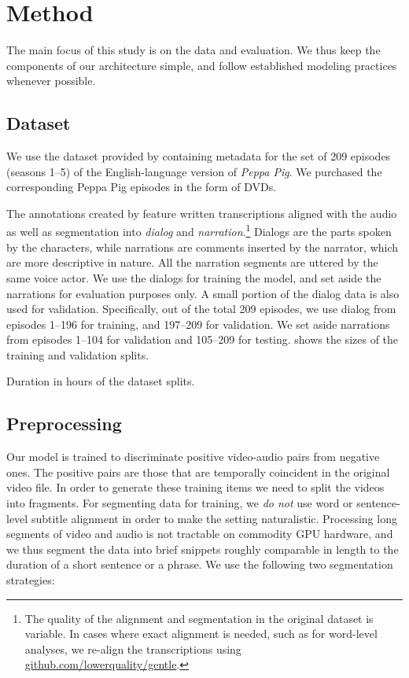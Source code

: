 \section{Method}
\label{sec:method}

The main focus of this study is on the data and evaluation. We thus
keep the components of our architecture simple, and follow established
modeling practices whenever possible.

\subsection{Dataset}
We use the dataset provided by \citet{papasarantopoulos2021narration}
containing metadata for the set of 209 episodes (seasons 1--5) of the
English-language version of {\it Peppa Pig}. We purchased the
corresponding Peppa Pig episodes in the form of DVDs. 

The annotations created by  \citet{papasarantopoulos2021narration}
feature written transcriptions aligned with the
audio as well as segmentation into {\it dialog} and {\it
  narration}.\footnote{The quality of the
  alignment and segmentation in the original dataset is variable. In
  cases where exact alignment is needed, such as for word-level
  analyses, we re-align the transcriptions using
  \url{github.com/lowerquality/gentle}.}  Dialogs are the parts spoken
by the characters, while narrations are comments inserted by the
narrator, which are more descriptive in nature. All the narration
segments are uttered by the same voice actor. We use the dialogs for
training the model, and set aside the narrations for evaluation
purposes only. A small portion of the dialog data is also used for
validation.  Specifically, out of the total 209 episodes, we use
dialog from episodes 1--196 for training, and 197--209 for
validation. We set aside narrations from episodes 1--104 for
validation and 105--209 for testing. 
shows the sizes of the training and validation splits.

\begin{table}[htb]
  \centering 
  \caption{Duration in hours of the dataset splits.}
  \label{tab:ds-stat}
\end{table}


\subsection{Preprocessing}
Our model is trained to discriminate positive video-audio pairs from
negative ones.  The positive pairs are those that are temporally
coincident in the original video file. In order to generate these
training items we need to split the videos into fragments.  For
segmenting data for training, we \emph{do not} use word or
sentence-level subtitle alignment in order to make the setting
naturalistic. Processing long segments of video and audio is not
tractable on commodity GPU hardware, and we thus segment the data into
brief snippets roughly comparable in length to the duration of a short
sentence or a phrase. We use the following two segmentation
strategies:

